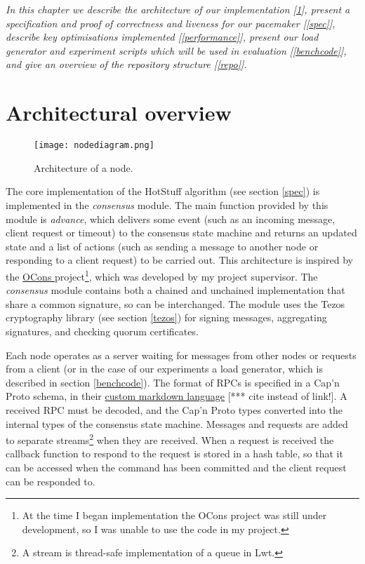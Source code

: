 \textit{In this chapter we describe the architecture of our implementation [\ref{overview}], present a specification and proof of correctness and liveness for our pacemaker [\ref{spec}], describe key optimisations implemented [\ref{performance}], present our load generator and experiment scripts which will be used in evaluation [\ref{benchcode}], and give an overview of the repository structure [\ref{repo}].}

\section{Architectural overview} \label{overview}

\begin{figure}[h!]
\centering
\texttt{[image: nodediagram.png]}
\caption{Architecture of a node.}
\label{nodediagram}
\end{figure}

The core implementation of the HotStuff algorithm (see section \ref{spec}) is implemented in the \textit{consensus} module. The main function provided by this module is \textit{advance}, which delivers some event (such as an incoming message, client request or timeout) to the consensus state machine and returns an updated state and a list of actions (such as sending a message to another node or responding to a client request) to be carried out. This architecture is inspired by the \href{https://github.com/Cjen1/OCons}{OCons }project\footnote{At the time I began implementation the OCons project was still under development, so I was unable to use the code in my project.}, which was developed by my project supervisor. The \textit{consensus} module contains both a chained and unchained implementation that share a common signature, so can be interchanged. The module uses the Tezos cryptography library (see section \ref{tezos}) for signing messages, aggregating signatures, and checking quorum certificates.

Each node operates as a server waiting for messages from other nodes or requests from a client (or in the case of our experiments a load generator, which is described in section \ref{benchcode}). The format of RPCs is specified in a Cap'n Proto schema, in their \href{https://capnproto.org/language.html}{custom markdown language} [*** cite instead of link!]. A received RPC must be decoded, and the Cap'n Proto types converted into the internal types of the consensus state machine. Messages and requests are added to separate streams\footnote{A stream is thread-safe implementation of a queue in Lwt.} when they are received. When a request is received the callback function to respond to the request is stored in a hash table, so that it can be accessed when the command has been committed and the client request can be responded to.

